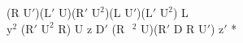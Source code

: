 (R $\text{U}'$)($\text{L}'$ U)($\text{R}'$ $\text{U}^2$)(L $\text{U}'$)($\text{L}'$ $\text{U}^2$) L\\
$\text{y}^2$ ($\text{R}'$ $\text{U}^2$ R) U z $\text{D}'$ (R$\text{ }^2$ U)($\text{R}'$ D R $\text{U}'$) $\text{z}'$ *\\
